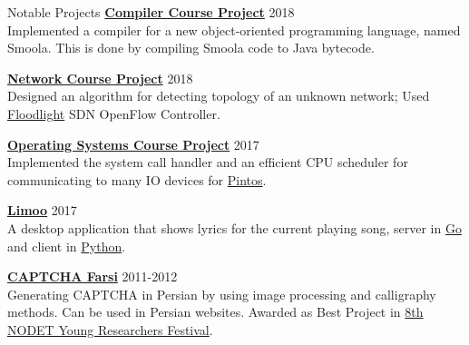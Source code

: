 \documentclass{resume} %
\begin{document}
\begin{rSection}{Notable Projects}
	{\bf \href{https://github.com/shayanh/Smoola}{Compiler Course Project}} \hfill 2018
	\\Implemented a compiler for a new object-oriented programming language, named Smoola. This is done by compiling Smoola code to Java bytecode.
	
	{\bf \href{https://github.com/shayanh/floodlight-sara-protocol}{Network Course Project}} \hfill 2018
	\\Designed an algorithm for detecting topology of an unknown network; Used \href{https://github.com/floodlight/floodlight}{Floodlight} SDN OpenFlow Controller.

	{\bf \href{https://github.com/shayanh/pintos}{Operating Systems Course Project}} \hfill 2017
	\\Implemented the system call handler and an efficient CPU scheduler for communicating to many IO devices for \href{https://en.wikipedia.org/wiki/Pintos}{Pintos}.

	{\bf \href{https://github.com/shayanh/limoo}{Limoo}} \hfill 2017
	\\A desktop application that shows lyrics for the current playing song, server in \href{https://github.com/shayanh/limoo-server}{Go} and client in \href{https://github.com/shayanh/limoo}{Python}.

	{\bf \href{https://github.com/KhassTeam/Persian-CAPTCHA}{CAPTCHA Farsi}} \hfill 2011-2012
	\\Generating CAPTCHA in Persian by using image processing and calligraphy methods. Can be used in Persian websites. Awarded as Best Project in
	\href{https://www.helli.ir/portal/content/%D8%AA%D9%82%D8%AF%DB%8C%D8%B1-%D8%A7%D8%B2-%D8%AF%D8%A7%D9%86%D8%B4-%D8%A2%D9%85%D9%88%D8%B2%D8%A7%D9%86-%D8%A8%D8%B1%D8%AA%D8%B1%D9%BE%DA%98%D9%88%D9%87%D8%B4%DA%AF%D8%B1}
		{8th NODET Young Researchers Festival}.
\end{rSection}
\end{document}
